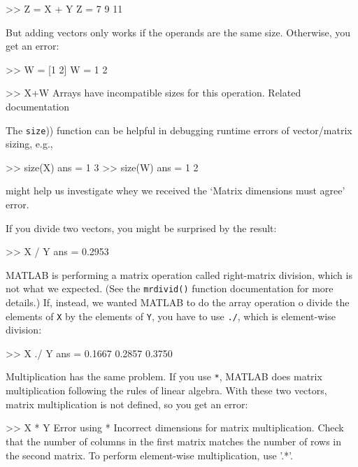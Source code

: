 \begin{code}
>> Z = X + Y
Z = 7     9    11
\end{code}

But adding vectors only works if the operands are the same size.
Otherwise, you get an error:

\begin{code}
>> W = [1 2]
W = 1     2

>> X+W
Arrays have incompatible sizes for this operation.
Related documentation 
\end{code}

The \lstinline(size()) function can be helpful in debugging runtime errors of vector/matrix sizing, e.g.,
\begin{code}
    >> size(X)
    ans =
         1     3
    >> size(W)
    ans =
         1     2
\end{code}
might help us investigate whey we received the `Matrix dimensions must agree' error.


If you divide two vectors, you might be surprised by the result:

\begin{code}
>> X / Y
ans = 0.2953
\end{code}

MATLAB is performing a matrix operation called right-matrix division, which is not what we expected.  (See the \lstinline{mrdivid()} function documentation for more details.)
If, instead, we wanted MATLAB to do the array operation o divide the elements of \lstinline{X} by the elements of \lstinline{Y}, you have to use \lstinline{./}, which is element-wise division:

\begin{code}
>> X ./ Y
ans = 0.1667    0.2857    0.3750
\end{code}

Multiplication has the same problem.  If you use \lstinline{*}, MATLAB does matrix multiplication following the rules of linear algebra.  With these two vectors, matrix multiplication is not defined, so you get an error:

\begin{code}
>> X * Y
Error using  *
Incorrect dimensions for matrix multiplication.
Check that the number of columns in the first matrix
matches the number of rows in the second matrix.
To perform element-wise multiplication, use '.*'.
\end{code}

